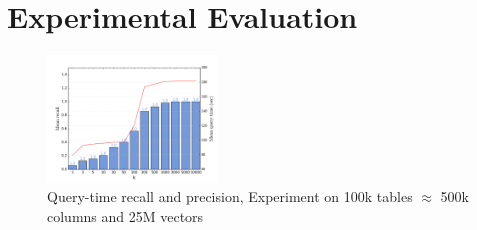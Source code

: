 \section{Experimental Evaluation}

\begin{figure}[H]
	\caption{Query-time recall and precision, Experiment on 100k tables $\approx$ 500k columns and 25M vectors}
	\centering
	\includegraphics[width=0.4\textwidth]{../../img/kashif_querytime_recall_precision.png}
\end{figure}
\vspace{1cm}